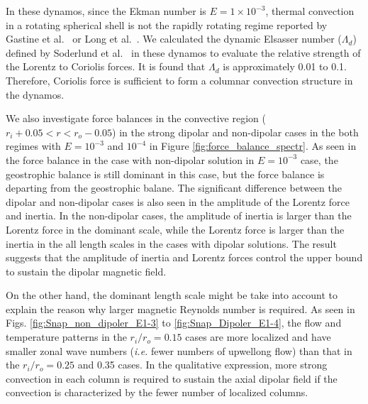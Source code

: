 {\color{red}
In these dynamos, since the Ekman number is $E = 1 \times 10^{-3}$, thermal convection in a rotating spherical shell is not the rapidly rotating regime reported by Gastine et al.\   or Long et al.\ . 
We calculated the dynamic Elsasser number ($\Lambda_d$) defined by Soderlund et al.\  in these dynamos to evaluate the relative strength of the Lorentz to Coriolis forces. 
It is found that $\Lambda_d$ is approximately 0.01 to 0.1. 
Therefore, Coriolis force is sufficient to form a columnar convection structure in the dynamos.
}
{\color{blue}
We also investigate force balances in the convective region ($r_{i} + 0.05 < r < r_{o} - 0.05$) in the strong dipolar and non-dipolar cases in the both regimes with $E = 10^{-3}$ and $10^{-4}$ in Figure \ref{fig:force_balance_spectr}. As seen in the force balance in the case with non-dipolar solution in $E = 10^{-3}$ case, the geostrophic balance is still dominant in this case, but the force balance is departing from the geostrophic balane.  The significant difference between the dipolar and non-dipolar cases is also seen in the amplitude of the Lorentz force and inertia. In the non-dipolar cases, the amplitude of inertia is larger than the Lorentz force in the dominant scale, while the Lorentz force is larger than the inertia in the all length scales in the cases with dipolar solutions. The result suggests that the amplitude of inertia and Lorentz forces control the upper bound to sustain the dipolar magnetic field.

On the other hand, the dominant length scale might be take into account to explain the reason why larger magnetic Reynolds number is required. As seen in Figs. \ref{fig:Snap_non_dipoler_E1-3} to \ref{fig:Snap_Dipoler_E1-4}, the flow and temperature patterns in the  $r_i/r_o  = 0.15$ cases are more localized and have smaller zonal wave numbers ({\it i.e.} fewer numbers of upwellong flow) than that in the $r_i/r_o  = 0.25$ and 0.35 cases. In the qualitative expression, more strong convection in each column is required to sustain the axial dipolar field if the convection is characterized by the fewer number of localized columns.
}

